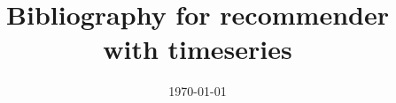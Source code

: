 \documentclass[letterpaper,11pt,reqno]{amsart}
\begin{document}
\title{Bibliography for recommender with timeseries}
\date{\today}
\maketitle

\nocite{*}


\end{document}
